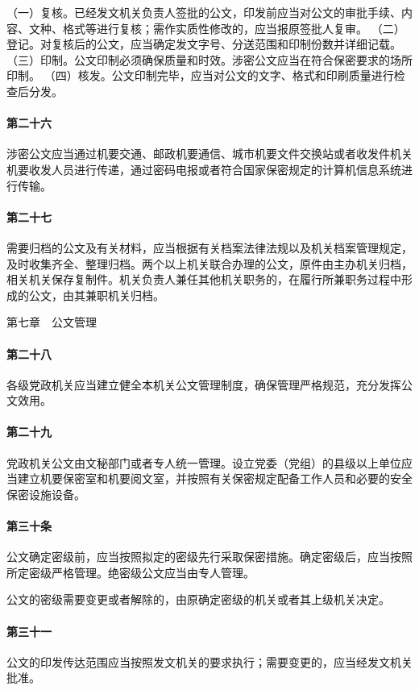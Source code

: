 \documentclass{gbt9704}
\begin{document}
（一）复核。已经发文机关负责人签批的公文，印发前应当对公文的审批手续、内容、文种、格式等进行复核；需作实质性修改的，应当报原签批人复审。
（二）登记。对复核后的公文，应当确定发文字号、分送范围和印制份数并详细记载。
（三）印制。公文印制必须确保质量和时效。涉密公文应当在符合保密要求的场所印制。
（四）核发。公文印制完毕，应当对公文的文字、格式和印刷质量进行检查后分发。
\paragraph{第二十六}涉密公文应当通过机要交通、邮政机要通信、城市机要文件交换站或者收发件机关机要收发人员进行传递，通过密码电报或者符合国家保密规定的计算机信息系统进行传输。

\paragraph{第二十七}需要归档的公文及有关材料，应当根据有关档案法律法规以及机关档案管理规定，及时收集齐全、整理归档。两个以上机关联合办理的公文，原件由主办机关归档，相关机关保存复制件。机关负责人兼任其他机关职务的，在履行所兼职务过程中形成的公文，由其兼职机关归档。


第七章　公文管理


\paragraph{第二十八}各级党政机关应当建立健全本机关公文管理制度，确保管理严格规范，充分发挥公文效用。

\paragraph{第二十九}党政机关公文由文秘部门或者专人统一管理。设立党委（党组）的县级以上单位应当建立机要保密室和机要阅文室，并按照有关保密规定配备工作人员和必要的安全保密设施设备。

\paragraph{第三十条}
公文确定密级前，应当按照拟定的密级先行采取保密措施。确定密级后，应当按照所定密级严格管理。绝密级公文应当由专人管理。

公文的密级需要变更或者解除的，由原确定密级的机关或者其上级机关决定。
\paragraph{第三十一}公文的印发传达范围应当按照发文机关的要求执行；需要变更的，应当经发文机关批准。
\end{document}
